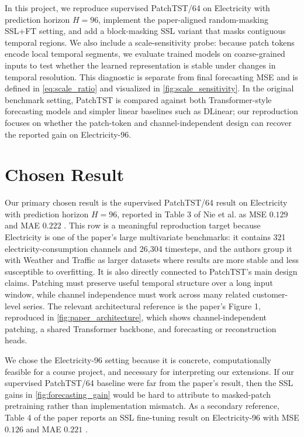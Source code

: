 \documentclass[11pt,twocolumn]{article}
\begin{document}
In this project, we reproduce supervised PatchTST/64 on Electricity with prediction horizon $H=96$, implement the paper-aligned random-masking SSL+FT setting, and add a block-masking SSL variant that masks contiguous temporal regions. We also include a scale-sensitivity probe: because patch tokens encode local temporal segments, we evaluate trained models on coarse-grained inputs to test whether the learned representation is stable under changes in temporal resolution. This diagnostic is separate from final forecasting MSE and is defined in \eqref{eq:scale_ratio} and visualized in \autoref{fig:scale_sensitivity}. In the original benchmark setting, PatchTST is compared against both Transformer-style forecasting models and simpler linear baselines such as DLinear; our reproduction focuses on whether the patch-token and channel-independent design can recover the reported gain on Electricity-96.



\section{Chosen Result}

Our primary chosen result is the supervised PatchTST/64 result on Electricity with prediction horizon $H=96$, reported in Table 3 of Nie et al. as MSE $0.129$ and MAE $0.222$ \cite{nie2023patchtst}. This row is a meaningful reproduction target because Electricity is one of the paper's large multivariate benchmarks: it contains 321 electricity-consumption channels and 26,304 timesteps, and the authors group it with Weather and Traffic as larger datasets where results are more stable and less susceptible to overfitting. It is also directly connected to PatchTST's main design claims. Patching must preserve useful temporal structure over a long input window, while channel independence must work across many related customer-level series. The relevant architectural reference is the paper's Figure 1, reproduced in \autoref{fig:paper_architecture}, which shows channel-independent patching, a shared Transformer backbone, and forecasting or reconstruction heads.

We chose the Electricity-96 setting because it is concrete, computationally feasible for a course project, and necessary for interpreting our extensions. If our supervised PatchTST/64 baseline were far from the paper's result, then the SSL gains in \autoref{fig:forecasting_gain} would be hard to attribute to masked-patch pretraining rather than implementation mismatch. As a secondary reference, Table 4 of the paper reports an SSL fine-tuning result on Electricity-96 with MSE $0.126$ and MAE $0.221$ \cite{nie2023patchtst}. 
\end{document}
